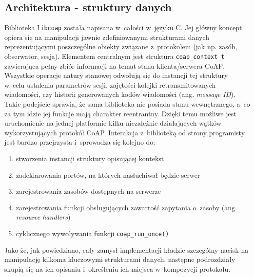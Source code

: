 
\subsection{Architektura - struktury danych}

Biblioteka \verb|libcoap| została napisana w~całości w~języku C. Jej główny koncept opiera się na manipulacji jawnie zdefiniowanymi strukturami danych reprezentującymi poszczególne obiekty związane z~protokołem (jak np. zasób, obserwator, sesja). Elementem centralnym jest struktura \verb|coap_context_t| zawierająca pełny zbiór informacji na temat stanu klienta/serwera CoAP. Wszystkie operacje natury stanowej odwołują się do instancji tej struktury w~celu ustalenia parametrów sesji, zajętości kolejki retransmitowanych wiadomości, czy historii generowanych kodów wiadomości (ang. \textit{message ID}). Takie podejście sprawia, że sama biblioteka nie posiada stanu wewnętrznego, a~co za tym idzie jej funkcje mają charakter reentrantny. Dzięki temu możliwe jest uruchomienie na jednej platformie kilku niezależnie działających wątków wykorzystujących protokół CoAP. Interakcja z~biblioteką od strony programisty jest bardzo przejrzysta i~sprowadza się kolejno do:

\begin{enumerate}
    \item stworzenia instancji struktury opisującej kontekst
    \item zadeklarowania portów, na których nasłuchiwał będzie serwer
    \item zarejestrowania zasobów dostępnych na serwerze
    \item zarejestrowania funkcji obsługujących zawartość zapytania o~zasoby (ang. \textit{resource handlers})
    \item cyklicznego wywoływania funkcji \verb|coap_run_once()|
\end{enumerate}

Jako że, jak powiedziano, cały zamysł implementacji kładzie szczególny nacisk na manipulację kilkoma kluczowymi strukturami danych, następne podrozdziały skupią się na ich opisaniu i~określeniu ich miejsca w~kompozycji protokołu.


